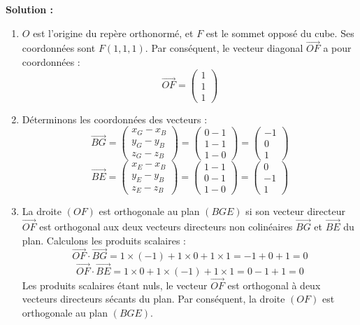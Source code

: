 \textbf{Solution :}
\begin{enumerate}
    \item $O$ est l'origine du repère orthonormé, et $F$ est le sommet opposé du cube. Ses coordonnées sont $F(1, 1, 1)$. Par conséquent, le vecteur diagonal $\vec{OF}$ a pour coordonnées :
    \[
    \vec{OF} = \begin{pmatrix} 1 \\ 1 \\ 1 \end{pmatrix}
    \]
    
    \item Déterminons les coordonnées des vecteurs :
    \[
    \vec{BG} = \begin{pmatrix} x_G-x_B \\ y_G-y_B \\ z_G-z_B \end{pmatrix} = \begin{pmatrix} 0-1 \\ 1-1 \\ 1-0 \end{pmatrix} = \begin{pmatrix} -1 \\ 0 \\ 1 \end{pmatrix}
    \]
    \[
    \vec{BE} = \begin{pmatrix} x_E-x_B \\ y_E-y_B \\ z_E-z_B \end{pmatrix} = \begin{pmatrix} 1-1 \\ 0-1 \\ 1-0 \end{pmatrix} = \begin{pmatrix} 0 \\ -1 \\ 1 \end{pmatrix}
    \]
    
    \item La droite $(OF)$ est orthogonale au plan $(BGE)$ si son vecteur directeur $\vec{OF}$ est orthogonal aux deux vecteurs directeurs non colinéaires $\vec{BG}$ et $\vec{BE}$ du plan. Calculons les produits scalaires :
    \[
    \vec{OF} \cdot \vec{BG} = 1 \times (-1) + 1 \times 0 + 1 \times 1 = -1 + 0 + 1 = 0
    \]
    \[
    \vec{OF} \cdot \vec{BE} = 1 \times 0 + 1 \times (-1) + 1 \times 1 = 0 - 1 + 1 = 0
    \]
    Les produits scalaires étant nuls, le vecteur $\vec{OF}$ est orthogonal à deux vecteurs directeurs sécants du plan. Par conséquent, la droite $(OF)$ est orthogonale au plan $(BGE)$.
    

\end{enumerate}
